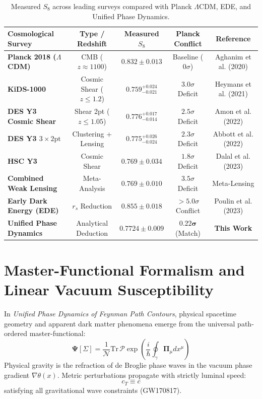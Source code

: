 \documentclass[11pt,a4paper]{article}
\begin{document}
\begin{table}[h!]
\centering
\small
\begin{tabular}{lcccc}
\toprule
\textbf{Cosmological Survey} & \textbf{Type / Redshift} & \textbf{Measured $S_8$} & \textbf{Planck Conflict} & \textbf{Reference} \\
\midrule
\textbf{Planck 2018 ($\Lambda$CDM)} & CMB ($z \approx 1100$) & $0.832 \pm 0.013$ & Baseline ($0\sigma$) & Aghanim et al. (2020) \\
\textbf{KiDS-1000} & Cosmic Shear ($z \le 1.2$) & $0.759^{+0.024}_{-0.021}$ & $3.0\sigma$ Deficit & Heymans et al. (2021) \\
\textbf{DES Y3 Cosmic Shear} & Shear 2pt ($z \le 1.05$) & $0.776^{+0.017}_{-0.014}$ & $2.5\sigma$ Deficit & Amon et al. (2022) \\
\textbf{DES Y3 $3\times 2\mathrm{pt}$} & Clustering + Lensing & $0.775^{+0.026}_{-0.024}$ & $2.3\sigma$ Deficit & Abbott et al. (2022) \\
\textbf{HSC Y3} & Cosmic Shear & $0.769 \pm 0.034$ & $1.8\sigma$ Deficit & Dalal et al. (2023) \\
\textbf{Combined Weak Lensing} & Meta-Analysis & $0.769 \pm 0.010$ & $3.5\sigma$ Deficit & Meta-Lensing \\
\textbf{Early Dark Energy (EDE)} & $r_s$ Reduction & $0.855 \pm 0.018$ & $> 5.0\sigma$ Conflict & Poulin et al. (2023) \\
\textbf{Unified Phase Dynamics} & Analytical Deduction & $\mathbf{0.7724 \pm 0.009}$ & $\mathbf{0.22\sigma}$ (Match) & \textbf{This Work} \\
\bottomrule
\end{tabular}
\caption{Measured $S_8$ across leading surveys compared with Planck $\Lambda$CDM, EDE, and Unified Phase Dynamics.}
\end{table}

\section{Master-Functional Formalism and Linear Vacuum Susceptibility}
In \textit{Unified Phase Dynamics of Feynman Path Contours}, physical spacetime geometry and apparent dark matter phenomena emerge from the universal path-ordered master-functional:
\begin{equation}
\mathbf{\Psi}[\Sigma] = \frac{1}{\mathcal{N}} \mathrm{Tr} \, \mathcal{P} \exp \left( \frac{i}{\hbar} \oint_\gamma \mathbf{\Pi}_\mu dx^\mu \right)
\end{equation}
Physical gravity is the refraction of de Broglie phase waves in the vacuum phase gradient $\nabla \theta(x)$. Metric perturbations propagate with strictly luminal speed:
\begin{equation}
c_T \equiv c
\end{equation}
satisfying all gravitational wave constraints (GW170817).
\end{document}
